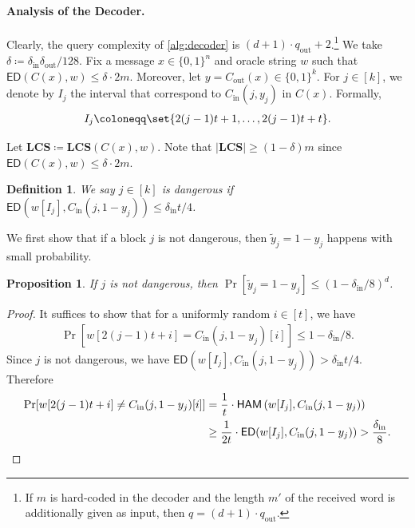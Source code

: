 \documentclass[10pt,a4paper]{article}
\newtheorem{proposition}{Proposition}
\newtheorem{definition}{Definition}
\theoremstyle{remark}
\newcommand{\ie}{\text{i.e.}\xspace}
\newcommand{\zo}{\ensuremath{{\{0,1\}}}\xspace}
\newcommand{\tuple}[1]{\ensuremath{\left(#1\right)}}
\newcommand{\tp}{\tuple}
\newcommand{\ED}{\ensuremath{\mathsf{ED}}\xspace}%
\newcommand{\HAM}{\ensuremath{\mathsf{HAM}}}
\newcommand{\Cout}{C_{\text{out}}}
\newcommand{\dout}{\delta_{\text{out}}}
\newcommand{\qout}{q_{\text{out}}}
\newcommand{\Cin}{C_{\text{in}}}
\newcommand{\din}{\delta_{\text{in}}}
\newcommand{\ham}{\HAM\xspace}
\newcommand{\LCS}{\ensuremath{\mathbf{LCS}}\xspace}
\begin{document}
\paragraph{Analysis of the Decoder.}
Clearly, the query complexity of \cref{alg:decoder} is $(d+1) \cdot \qout + 2$.\footnote{If $m$ is hard-coded in the decoder and the length $m'$ of the received word is additionally given as input, then $q = (d+1)\cdot \qout$.} 
We take $\delta\coloneqq \din\dout/128$.
Fix a message $x \in \zo^n$ and oracle string $w$ such that $\ED(C(x), w) \leq \delta \cdot 2m$.
Moreover, let $y = \Cout(x) \in \zo^k$.
For $j \in [k]$, we denote by $I_j$ the interval that correspond to $\Cin(j, y_j)$ in $C(x)$. Formally, 
\begin{align*}
	I_j \coloneqq \set{2(j-1)t+1, \dotsc, 2(j-1)t + t}.
\end{align*}




Let $\LCS \coloneqq \LCS(C(x), w)$.
Note that $|\LCS| \geq (1-\delta)m$ since $\ED(C(x), w) \leq \delta \cdot 2m$.
\begin{definition}
	We say $j\in [k]$ is \emph{dangerous} if $\ED\tp{w[I_j], \Cin(j, 1-y_j)} \le \din t/4$.
\end{definition}
We first show that if a block $j$ is not dangerous, then $\widetilde{y}_j = 1-y_j$ happens with small probability.
\begin{proposition}\label{prop:dangerous-bad}
	If $j$ is not dangerous, then $\Pr[\widetilde{y}_j = 1-y_j] \leq (1-\din/8)^d$.
\end{proposition}
\begin{proof}
	It suffices to show that for a uniformly random $i \in [t]$, we have 
	\begin{align*}
		\Pr\left[w[2(j-1)t+i] = \Cin(j,1-y_j)[i]\right] \le 1-\din/8.
	\end{align*}
	Since $j$ is not dangerous, we have $\ED(w[I_j], \Cin(j,1-y_j))>\din t/4$. Therefore
	\begin{align*}
		\Pr[w[{2(j-1)t+i}] \neq \Cin(j,1-y_j)[i]] &= \frac{1}{t} \cdot \ham\tp{w[{I_j}], \Cin(j,1-y_j)}\\ 
		&\ge \frac{1}{2t} \cdot \ED(w[I_j], \Cin(j,1-y_j))
		> \frac{\din}{8}.\qedhere
	\end{align*}
\end{proof}
\end{document}
